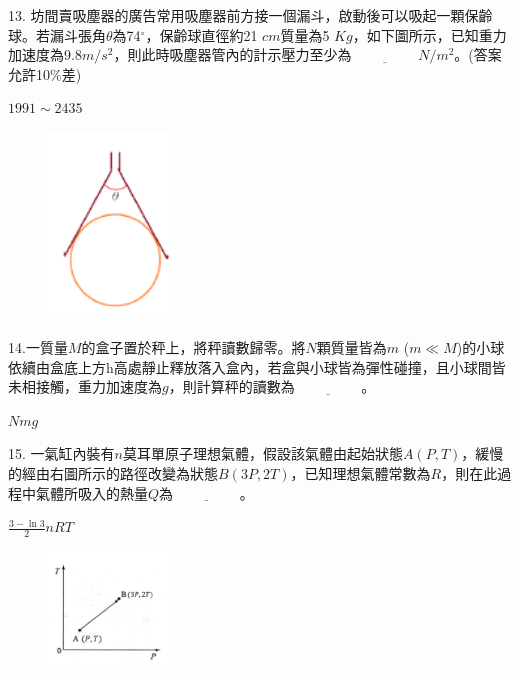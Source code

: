 \documentclass[cn,10pt,math=newtx]{elegantbook}
\begin{document}
\begin{example}
   13. 坊間賣吸塵器的廣告常用吸塵器前方接一個漏斗，啟動後可以吸起一顆保齡球。若漏斗張角$\theta$為74$^\circ$，保齡球直徑約21 $cm$質量為5 $Kg$，如下圖所示，已知重力加速度為9.8$m/s^2$，則此時吸塵器管內的計示壓力至少為$\underline{\hspace{2cm}} N/m^2$。(答案允許10$\%$差)\\
    \rightline{[桃園高中教甄109]}
\end{example}
\begin{solution}
    $1991\sim2435$
\end{solution}
\begin{figure}[htbp]
    \flushright
    \includegraphics[width=0.3\textwidth]{image/109桃園13.png}
  \end{figure}
\newpage


\begin{example}
   14.一質量$M$的盒子置於秤上，將秤讀數歸零。將$N$顆質量皆為$m$ ($m\ll M$)的小球依續由盒底上方h高處靜止釋放落入盒內，若盒與小球皆為彈性碰撞，且小球間皆未相接觸，重力加速度為$g$，則計算秤的讀數為$\underline{\hspace{2cm}}$。\\
    \rightline{[桃園高中教甄109]}
\end{example}
\begin{solution}
    $Nmg$
\end{solution}

\newpage


\begin{example}
   15. 一氣缸內裝有$n$莫耳單原子理想氣體，假設該氣體由起始狀態$A(P,T)$，緩慢的經由右圖所示的路徑改變為狀態$B(3P,2T)$，已知理想氣體常數為$R$，則在此過程中氣體所吸入的熱量$Q$為$\underline{\hspace{2cm}}$。\\
    \rightline{[桃園高中教甄109]}
\end{example}
\begin{solution}
    $\frac{3-\ln{3}}{2} nRT$
\end{solution}
\begin{figure}[htbp]
    \flushright
    \includegraphics[width=0.3\textwidth]{image/109桃園15.png}
  \end{figure}
\newpage
\end{document}
